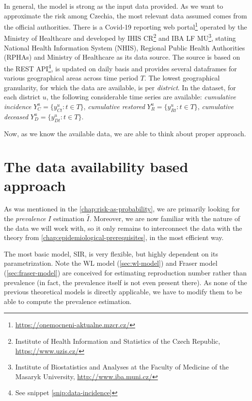 \documentclass[
  digital, %
  oneside, %
  lof,     %
  lot,     %
]{fithesis4}
\begin{document}
In general, the model is strong as the input data provided.
As we want to approximate the risk among Czechia, the most 
relevant data assumed comes from the official authorities.
There is a Covid-19 reporting web 
portal\footnote{\url{https://onemocneni-aktualne.mzcr.cz/}} operated 
by the Ministry of Healthcare and developed by IHIS CR\footnote{Institute of Health Information and Statistics of the Czech Republic, \url{https://www.uzis.cz/}} 
and IBA LF MU\footnote{Institute of Biostatistics and Analyses at the Faculty of Medicine of the Masaryk University, \url{http://www.iba.muni.cz/}}, 
stating National Health Information System (NHIS), Regional Public 
Health Authorities (RPHAs) and Ministry of Healthcare as its 
data source. 
The source is based on the REST API\footnote{See snippet \ref{snip:data-incidence}}, 
is updated on daily basis and provides several 
dataframes for various geographical areas across time period $T$.
The lowest geographical granularity, for which the data are available, 
is per \textit{district}.
In the dataset, for each district $u$, the following considerable 
time series are available:
\textit{cumulative incidence} $Y_C^u = \{ y_{Ct}^u : t \in T \}$,
\textit{cumulative restored} $Y_R^u = \{ y_{R t}^u : t \in T \}$,
\textit{cumulative deceased} $Y_D^u = \{ y_{D t}^u : t \in T \}$.

Now, as we know the available data, we are able to think about 
proper approach.


\section{The data availability based approach}

As was mentioned in the \autoref{chap:risk-as-probability},
we are primarily looking for the \textit{prevalence} $I$ 
estimation $\hat{I}$. Moreover, we are now familiar with
the nature of the data we will work with, so it only remains
to interconnect the data with the theory from \autoref{chap:epidemiological-prerequisites},
in the most efficient way.

The most basic model, SIR, is very flexible, but highly dependent 
on its parametrization.
Note the WL model (\autoref{sec:wl-model}) and Fraser model
(\autoref{sec:fraser-model}) are conceived for
estimating reproduction number rather than prevalence
(in fact, the prevalence itself is not even present there).
As none of the previous theoretical models is directly applicable,
we have to modify them to be able to compute the prevalence
estimation.
\end{document}
